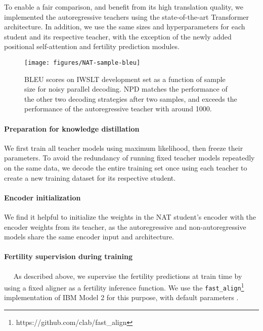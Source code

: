 \documentclass{article} \usepackage{iclr2018_conference,times}
\begin{document}
To enable a fair comparison, and benefit from its high translation quality, we implemented the autoregressive teachers using the state-of-the-art Transformer architecture. In addition, we use the same sizes and hyperparameters for each student and its respective teacher, with the exception of the newly added positional self-attention and fertility prediction modules.

\begin{wrapfigure}{r}{0.45\textwidth} 
\vspace{-10pt}
\centering
\texttt{[image: figures/NAT-sample-bleu]}
\caption{\label{fig.noisy_decoding} BLEU scores on IWSLT development set as a function of sample size for noisy parallel decoding. NPD matches the performance of the other two decoding strategies after two samples, and exceeds the performance of the autoregressive teacher with around 1000.}
\vspace{-20pt}
\end{wrapfigure}

\vspace{-5pt}
\paragraph{Preparation for knowledge distillation} We first train all teacher models using maximum likelihood, then freeze their parameters. To avoid the redundancy of running fixed teacher models repeatedly on the same data, we decode the entire training set once using each teacher to create a new training dataset for its respective student.

\vspace{-5pt}
\paragraph{Encoder initialization}
We find it helpful to initialize the weights in the NAT student's encoder with the encoder weights from its teacher, as the autoregressive and non-autoregressive models share the same encoder input and architecture.

\vspace{-5pt}
\paragraph{Fertility supervision during training}~~
As described above, we supervise the fertility predictions at train time by using a fixed aligner as a fertility inference function. We use the \texttt{fast\_align}\footnote{https://github.com/clab/fast\_align} implementation of IBM Model 2 for this purpose, with default parameters
\citep{dyer2013simple}.
\end{document}
